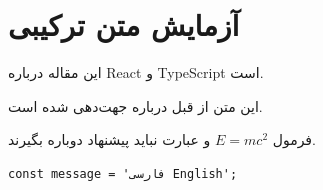 \documentclass{article}
\begin{document}
\section{آزمایش متن ترکیبی}
این مقاله درباره React و TypeScript است.

این متن از قبل درباره  جهت‌دهی شده است.

فرمول \( E = mc^2 \) و عبارت  نباید پیشنهاد دوباره بگیرند.

\begin{verbatim}
const message = 'فارسی English';
\end{verbatim}
\end{document}
